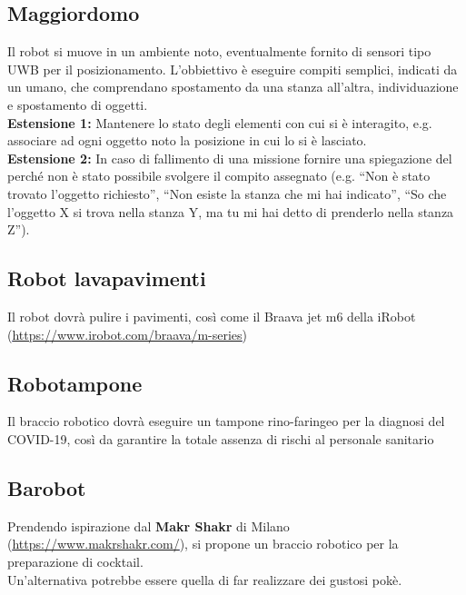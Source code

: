 \documentclass[a4paper]{article}
\begin{document}
	\subsection{Maggiordomo}\label{subsec:Maggiordomo}
	Il robot si muove in un ambiente noto, eventualmente fornito di sensori tipo UWB per il posizionamento. L'obbiettivo è eseguire compiti semplici, indicati da un umano, che comprendano spostamento da una stanza all'altra, individuazione e spostamento di oggetti.\\
	\textbf{Estensione 1:} Mantenere lo stato degli elementi con cui si è interagito, e.g. associare ad ogni oggetto noto la posizione in cui lo si è lasciato.\\
	\textbf{Estensione 2:} In caso di fallimento di una missione fornire una spiegazione del perché non è stato possibile svolgere il compito assegnato (e.g. ``Non è stato trovato l'oggetto richiesto'', ``Non esiste la stanza che mi hai indicato'', ``So che l'oggetto X si trova nella stanza Y, ma tu mi hai detto di prenderlo nella stanza Z'').
	
	\subsection{Robot lavapavimenti}\label{subsec:Robot-lavapavimenti}
	Il robot dovrà pulire i pavimenti, così come il Braava jet m6 della iRobot (\textcolor{blue}{\underline{\url{https://www.irobot.com/braava/m-series}}})
	
	\subsection{Robotampone}\label{subsec:Robotampone}
	Il braccio robotico dovrà eseguire un tampone rino-faringeo per la diagnosi del COVID-19, così da garantire la totale assenza di rischi al personale sanitario
	
	\subsection{Barobot}\label{subsec:Barobot}
	Prendendo ispirazione dal \textbf{Makr Shakr} di Milano (\textcolor{blue}{\underline{\url{https://www.makrshakr.com/}}}), si propone un braccio robotico per la preparazione di cocktail. \\
	Un'alternativa potrebbe essere quella di far realizzare dei gustosi pokè.

	
	
	
	
\end{document}
